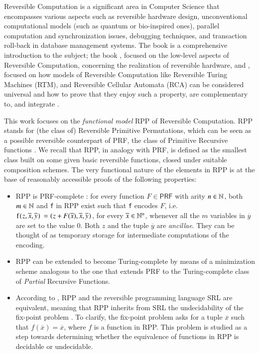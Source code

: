 \documentclass[preprint]{elsarticle}
\theoremstyle{remark}
\newcommand{\RPP}{\textsf{RPP}\xspace}
\newcommand{\PRF}{\textsf{PRF}\xspace}
\newcommand{\SRL}{\textsf{SRL}\xspace}
\begin{document}
Reversible Computation is a significant area in Computer Science that encompasses various aspects such as reversible hardware design, unconventional computational models (such as quantum or bio-inspired ones), parallel computation and synchronization issues, debugging techniques, and transaction roll-back in database management systems.
The book \cite{perumalla2013chc} is a comprehensive introduction to the subject; the book \cite{DBLP:books/daglib/0025734}, focused on the low-level aspects of Reversible Computation, concerning the realization of reversible hardware, and
\cite{DBLP:series/eatcs/Morita17}, focused on how models of Reversible Computation like Reversible Turing Machines (RTM), and Reversible Cellular Automata (RCA) can be considered universal and how to prove that they enjoy such a property, are complementary to, and integrate \cite{perumalla2013chc}.

This work focuses on the \emph{functional model} \RPP \cite{DBLP:journals/tcs/PaoliniPR20} of Reversible Computation.
\RPP stands for (the class of) Reversible Primitive Permutations, which can be seen as a possible reversible counterpart of \PRF, the class of Primitive Recursive functions \cite{rogers1967theory}.
We recall that \RPP, in analogy with \PRF, is defined as the smallest class built on some given basic reversible functions, closed under suitable composition schemes.
The very functional nature of the elements in \RPP is at the base of reasonably accessible proofs of the following properties:
\begin{itemize}
\item \RPP is \PRF-complete \cite{DBLP:journals/tcs/PaoliniPR20}: for every function $ F \in \PRF $ with arity $ n \in \mathbb{N} $, both $ m \in \mathbb{N} $ and \lstinline|f| in \RPP exist such that \lstinline|f| encodes $ F $, i.e.
$ \mbox{\lstinline|f(|}z,\overline{x},\overline{y}\mbox{\lstinline|) = (|}z+F(\overline{x}),\overline{x},\overline{y}\mbox{\lstinline|)|}$, for every $ \overline{x}\in \mathbb{N}^n $, whenever all the $m$ variables in $ \overline{y} $ are set to the value $ 0 $.
Both $ z $ and the tuple $ \overline{y} $ are \emph{ancillae}. They can be thought of as temporary storage for intermediate computations of the encoding.

\item \RPP can be extended to become Turing-complete \cite{Paolini2018NGC} by means of a minimization scheme analogous to the one that extends \PRF to the Turing-complete class of \emph{Partial} Recursive Functions.

\item According to \cite{MatosRC2020}, \RPP and the reversible programming language \SRL \cite{matos03tcs} are equivalent, meaning that \RPP inherits from \SRL the undecidability of the fix-point problem \cite{2318_1734164MatosPaoliniRoversiTCSICTCS18}. To clarify, the fix-point problem asks for a tuple $\overline{x}$ such that $f(\overline{x}) = \overline{x}$, where $f$ is a function in \RPP. This problem is studied as a step towards determining whether the equivalence of functions in \RPP is decidable or undecidable.
\end{itemize}
\end{document}
